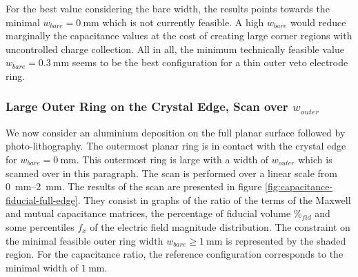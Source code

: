 For the best value considering the bare width, the results points towards the minimal $w_{bare} = \SI{0}{\mm}$ which is not currently feasible. A high $w_{bare}$ would reduce marginally the capacitance values at the cost of creating large corner regions with uncontrolled charge collection. All in all, the minimum technically feasible value $w_{bare}=\SI{0.3}{\mm}$ seems to be the best configuration for a thin outer veto electrode ring.


\subsubsection{Large Outer Ring on the Crystal Edge, Scan over $w_{outer}$}

We now consider an aluminium deposition on the full planar surface followed by photo-litho\-gra\-phy. The outermost planar ring is in contact with the crystal edge for $w_{bare}=\SI{0}{\mm}$. This outermost ring is large with a width of $w_{outer}$ which is scanned over in this paragraph. The scan is performed over a linear scale from \SIrange{0}{2}{\mm}. The results of the scan are presented in figure \ref{fig:capacitance-fiducial-full-edge}. They consist in graphs of the ratio of the terms of the Maxwell and mutual capacitance matrices, the percentage of fiducial volume $\%_{fid}$ and some percentiles $f_x$ of the electric field magnitude distribution. The constraint on the minimal feasible outer ring width $w_{bare} \geq \SI{1}{\mm}$ is represented by the shaded region. For the capacitance ratio, the reference configuration corresponds to the minimal width of $\SI{1}{\mm}$.

